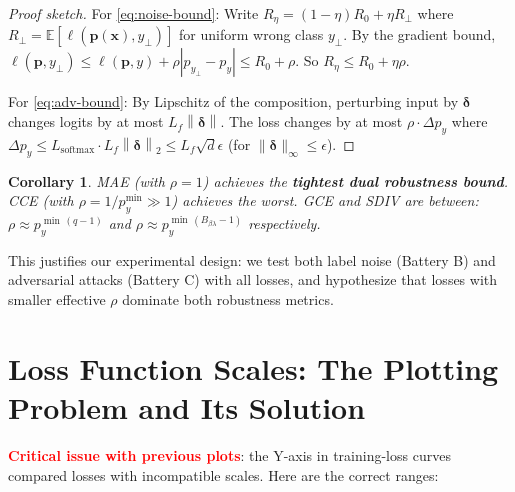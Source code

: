 \documentclass[11pt,a4paper]{article}
\newtheorem{corollary}[theorem]{Corollary}
\newcommand{\softmax}{\operatorname{softmax}}
\newcommand{\E}{\mathbb{E}}
\newcommand{\norm}[1]{\left\|#1\right\|}
\newcommand{\pb}{\mathbf{p}}
\newcommand{\xb}{\mathbf{x}}
\newcommand{\Bsd}{B_{\beta\lambda}}
\begin{document}
\begin{proof}[Proof sketch]
For \cref{eq:noise-bound}: Write $R_\eta = (1-\eta)R_0 + \eta R_\perp$ where
$R_\perp = \E[\ell(\pb(\xb),y_\perp)]$ for uniform wrong class $y_\perp$.
By the gradient bound, $\ell(\pb,y_\perp) \leq \ell(\pb,y) + \rho|p_{y_\perp} - p_y| \leq R_0 + \rho$.
So $R_\eta \leq R_0 + \eta\rho$.

For \cref{eq:adv-bound}: By Lipschitz of the composition, perturbing input by $\boldsymbol{\delta}$
changes logits by at most $L_f\norm{\boldsymbol{\delta}}$. The loss changes by at most
$\rho \cdot \Delta p_y$ where $\Delta p_y \leq L_\softmax \cdot L_f \norm{\boldsymbol{\delta}}_2
\leq L_f\sqrt{d}\epsilon$ (for $\|\boldsymbol{\delta}\|_\infty \leq \epsilon$).
\end{proof}

\begin{corollary}
MAE (with $\rho=1$) achieves the \textbf{tightest dual robustness bound}. CCE
(with $\rho = 1/p_y^{\min} \gg 1$) achieves the worst. GCE and SDIV are between:
$\rho \approx p_y^{\min\,(q-1)}$ and $\rho \approx p_y^{\min\,(\Bsd-1)}$ respectively.
\end{corollary}

This justifies our experimental design: we test both label noise (Battery B) and
adversarial attacks (Battery C) with all losses, and hypothesize that losses with
smaller effective $\rho$ dominate both robustness metrics.

\section{Loss Function Scales: The Plotting Problem and Its Solution}
\label{sec:scales}

\textcolor{red}{\textbf{Critical issue with previous plots}}: the Y-axis in training-loss
curves compared losses with incompatible scales. Here are the correct ranges:
\end{document}
